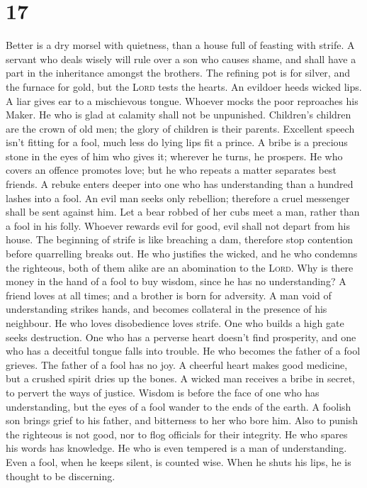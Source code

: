\hypertarget{section-16}{%
\section{17}\label{section-16}}

 Better is a dry morsel with quietness, than a house full
of feasting with strife.  A servant who deals wisely will
rule over a son who causes shame, and shall have a part in the
inheritance amongst the brothers.  The refining pot is for
silver, and the furnace for gold, but the \textsc{Lord} tests the
hearts.  An evildoer heeds wicked lips. A liar gives ear
to a mischievous tongue.  Whoever mocks the poor
reproaches his Maker. He who is glad at calamity shall not be
unpunished.  Children's children are the crown of old men;
the glory of children is their parents.  Excellent speech
isn't fitting for a fool, much less do lying lips fit a prince.
 A bribe is a precious stone in the eyes of him who gives
it; wherever he turns, he prospers.  He who covers an
offence promotes love; but he who repeats a matter separates best
friends.  A rebuke enters deeper into one who has
understanding than a hundred lashes into a fool.  An evil
man seeks only rebellion; therefore a cruel messenger shall be sent
against him.  Let a bear robbed of her cubs meet a man,
rather than a fool in his folly.  Whoever rewards evil
for good, evil shall not depart from his house.  The
beginning of strife is like breaching a dam, therefore stop contention
before quarrelling breaks out.  He who justifies the
wicked, and he who condemns the righteous, both of them alike are an
abomination to the \textsc{Lord}.  Why is there money in
the hand of a fool to buy wisdom, since he has no understanding?
 A friend loves at all times; and a brother is born for
adversity.  A man void of understanding strikes hands,
and becomes collateral in the presence of his neighbour. 
He who loves disobedience loves strife. One who builds a high gate seeks
destruction.  One who has a perverse heart doesn't find
prosperity, and one who has a deceitful tongue falls into trouble.
 He who becomes the father of a fool grieves. The father
of a fool has no joy.  A cheerful heart makes good
medicine, but a crushed spirit dries up the bones.  A
wicked man receives a bribe in secret, to pervert the ways of justice.
 Wisdom is before the face of one who has understanding,
but the eyes of a fool wander to the ends of the earth. 
A foolish son brings grief to his father, and bitterness to her who bore
him.  Also to punish the righteous is not good, nor to
flog officials for their integrity.  He who spares his
words has knowledge. He who is even tempered is a man of understanding.
 Even a fool, when he keeps silent, is counted wise. When
he shuts his lips, he is thought to be discerning.

